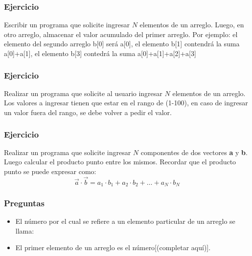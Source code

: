 \subsubsection{Ejercicio}
Escribir un programa que solicite ingresar $N$ elementos de un arreglo. Luego, en otro arreglo, almacenar el valor acumulado del primer arreglo. Por ejemplo: el elemento del segundo arreglo b[0] será a[0], el elemento b[1] contendrá la suma a[0]+a[1], el elemento b[3] contedrá la suma a[0]+a[1]+a[2]+a[3]
{\small
  \lstset{inputencoding=utf8/latin1}
  
}

\subsubsection{Ejercicio}
Realizar un programa que solicite al usuario ingresar $N$ elementos de un arreglo. Los valores a ingresar tienen que estar en el rango de (1-100), en caso de ingresar un valor fuera del rango, se debe volver a pedir el valor.
{\small
  \lstset{inputencoding=utf8/latin1}
  
}
\subsubsection{Ejercicio}
Realizar un programa que solicite ingresar $N$ componentes de dos vectores \textbf{a} y \textbf{b}. Luego calcular el producto punto entre los mismos.
Recordar que el producto punto se puede expresar como:
$$\overrightarrow{a}\cdot \overrightarrow{b} = a_1\cdot b_1 + a_2\cdot b_2 +\dots + a_N\cdot b_N$$
{\small
  \lstset{inputencoding=utf8/latin1}
  
}

\subsubsection{Preguntas} 
\begin{itemize}
  \item El número por el cual se refiere a un elemento particular de un arreglo se llama:
  \item El primer elemento de un arreglo es el número[(completar aquí)].
\end{itemize}

